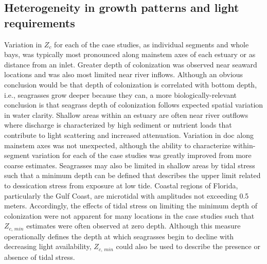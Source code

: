 \documentclass[letterpaper,12pt,oneside]{article}\usepackage[]{graphicx}\usepackage[]{color}
\begin{document}
\subsection{Heterogeneity in growth patterns and light requirements}

Variation in $Z_c$ for each of the case studies, as individual segments and whole bays, was typically most pronounced along mainstem axes of each estuary or as distance from an inlet.  Greater depth of colonization was observed near seaward locations and was also most limited near river inflows.  Although an obvious conclusion would be that depth of colonization is correlated with bottom depth, i.e., seagrasses grow deeper because they can, a more biologically-relevant conclusion is that seagrass depth of colonization follows expected spatial variation in water clarity.  Shallow areas within an estuary are often near river outflows where discharge is characterized by high sediment or nutrient loads that contribute to light scattering and increased attenuation.  Variation in \ac{doc} along mainstem axes was not unexpected, although the ability to characterize within-segment variation for each of the case studies was greatly improved from more coarse estimates.  Seagrasses may also be limited in shallow areas by tidal stress such that a minimum depth can be defined that describes the upper limit related to dessication stress from exposure at low tide.  Coastal regions of Florida, particularly the Gulf Coast, are microtidal with amplitudes not exceeding 0.5 meters.  Accordingly, the effects of tidal stress on limiting the minimum depth of colonization were not apparent for many locations in the case studies such that $Z_{c,\,min}$ estimates were often observed at zero depth.  Although this measure operationally defines the depth at which seagrasses begin to decline with decreasing light availability, $Z_{c,\,min}$ could also be used to describe the presence or absence of tidal stress.
\end{document}
